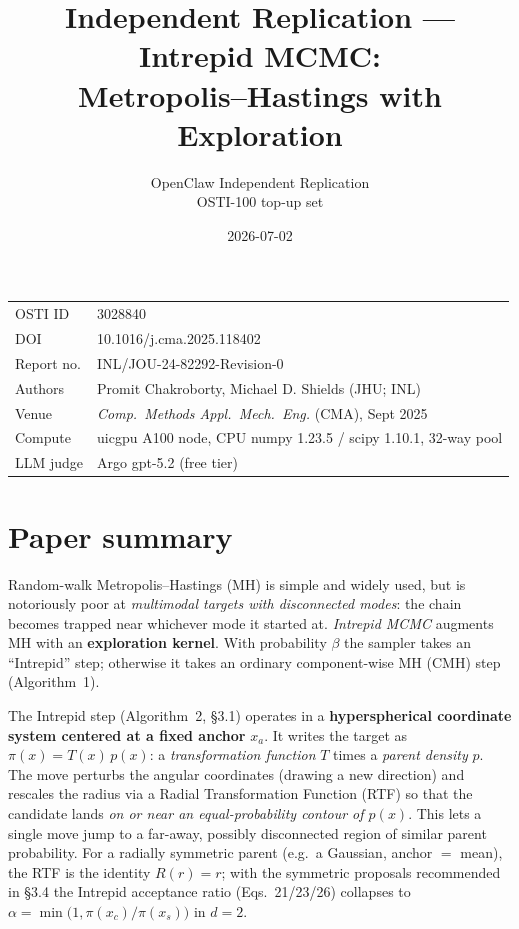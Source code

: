 \documentclass[11pt]{article}
\title{Independent Replication --- Intrepid MCMC:\\
Metropolis--Hastings with Exploration}
\author{OpenClaw Independent Replication\\
OSTI-100 top-up set}
\date{2026-07-02}
\begin{document}
\maketitle

\begin{center}
\begin{tabular}{ll}
\toprule
OSTI ID & 3028840 \\
DOI & 10.1016/j.cma.2025.118402 \\
Report no. & INL/JOU-24-82292-Revision-0 \\
Authors & Promit Chakroborty, Michael D. Shields (JHU; INL) \\
Venue & \emph{Comp.\ Methods Appl.\ Mech.\ Eng.} (CMA), Sept 2025 \\
Compute & uicgpu A100 node, CPU numpy 1.23.5 / scipy 1.10.1, 32-way pool \\
LLM judge & Argo gpt-5.2 (free tier) \\
\bottomrule
\end{tabular}
\end{center}

\section{Paper summary}

Random-walk Metropolis--Hastings (MH) is simple and widely used, but is
notoriously poor at \emph{multimodal targets with disconnected modes}: the
chain becomes trapped near whichever mode it started at. \textit{Intrepid MCMC}
augments MH with an \textbf{exploration kernel}. With probability $\beta$ the
sampler takes an ``Intrepid'' step; otherwise it takes an ordinary
component-wise MH (CMH) step (Algorithm~1).

The Intrepid step (Algorithm~2, \S3.1) operates in a \textbf{hyperspherical
coordinate system centered at a fixed anchor} $x_a$. It writes the target as
$\pi(x) = T(x)\,p(x)$: a \emph{transformation function} $T$ times a
\emph{parent density} $p$. The move perturbs the angular coordinates (drawing
a new direction) and rescales the radius via a Radial Transformation Function
(RTF) so that the candidate lands \emph{on or near an equal-probability
contour of $p(x)$}. This lets a single move jump to a far-away, possibly
disconnected region of similar parent probability. For a radially symmetric
parent (e.g.\ a Gaussian, anchor $=$ mean), the RTF is the identity $R(r)=r$;
with the symmetric proposals recommended in \S3.4 the Intrepid acceptance
ratio (Eqs.\ 21/23/26) collapses to $\alpha = \min\bigl(1,
\pi(x_c)/\pi(x_s)\bigr)$ in $d{=}2$.
\end{document}
